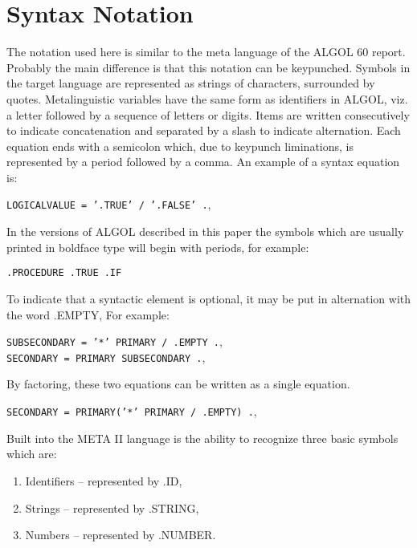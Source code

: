 \documentclass[twocolumn]{article}
\begin{document}
\section{Syntax Notation}

The notation used here is similar to the meta language of the ALGOL 60 report.
Probably the main difference is that this notation can be keypunched.
Symbols in the target language are represented as strings of characters,
surrounded by quotes.
Metalinguistic variables have the same form as identifiers in ALGOL, viz. a
letter followed by a sequence of letters or digits.
Items are written consecutively to indicate concatenation and separated by a
slash to indicate alternation. Each equation ends with a semicolon which,
due to keypunch liminations, is represented by a period followed by a comma.
An example of a syntax equation is:

\begin{center}
{\tt LOGICALVALUE = '.TRUE' / '.FALSE' .},
\end{center}

In the versions of ALGOL described in this paper the symbols which are usually
printed in boldface type will begin with periods, for example:

\begin{center}
{\tt .PROCEDURE .TRUE .IF }
\end{center}

To indicate that a syntactic element is optional, it may be put in alternation
with the word .EMPTY, For example:

\begin{center}
{\tt SUBSECONDARY = '*' PRIMARY / .EMPTY .}, \\
{\tt SECONDARY = PRIMARY SUBSECONDARY .},
\end{center}

By factoring, these two equations can be written as a single equation.

\begin{center}
{\tt SECONDARY = PRIMARY('*' PRIMARY / .EMPTY) .},
\end{center}

Built into the META II language is the ability to recognize three basic symbols
which are: 

\begin{enumerate}
\item Identifiers -- represented by .ID,
\item Strings -- represented by .STRING,
\item Numbers -- represented by .NUMBER.
\end{enumerate}
\end{document}
